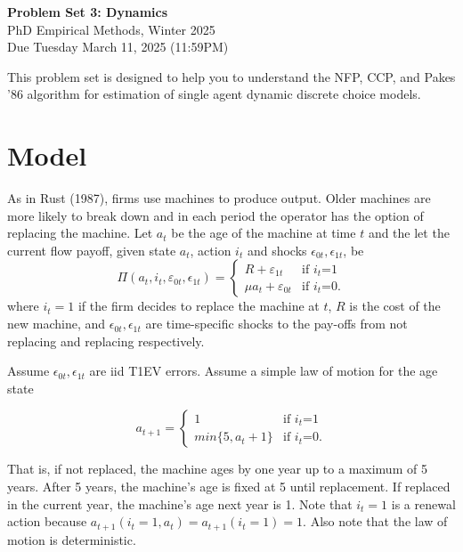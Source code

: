 \documentclass[11pt ]{article}
\begin{document}
\large\noindent
\textbf{Problem Set 3: Dynamics}\\
PhD Empirical Methods, Winter 2025\\
Due Tuesday March 11, 2025 (11:59PM)

\vspace{2em}\noindent
This problem set is designed to help you to understand the NFP, CCP, and Pakes '86 algorithm for estimation of single agent dynamic discrete choice models.

\section{Model}
As in Rust (1987), firms use machines to produce output. Older machines are more likely to break down and in each period the operator has the option of replacing the machine. Let $a_t$ be the age of the machine at time $t$ and the let the current flow payoff, given state $a_t$, action $i_t$ and shocks $\epsilon_{0t}, \epsilon_{1t}$, be
\[ \Pi(a_t, i_t, \varepsilon_{0t}, \epsilon_{1t}) = \left\{ \begin{array}{ll}
         R + \varepsilon_{1t} & \mbox{if $i_t$=1}\\
        \mu a_t +\varepsilon_{0t} & \mbox{if $i_t$=0}.\end{array} \right. \] 
 where $i_t = 1$ if the firm decides to replace the machine at $t$, $R$ is the cost of the new machine, and $\epsilon_{0t}, \epsilon_{1t}$ are time-specific shocks to the pay-offs from not replacing and replacing respectively. 

Assume $\epsilon_{0t}, \epsilon_{1t}$ are iid T1EV errors. Assume a simple law of motion for the age state

\[ a_{t+1} = \left\{ \begin{array}{ll}
       1 & \mbox{if $i_t$=1}\\
       min\{5, a_t + 1\}  & \mbox{if $i_t$=0}.\end{array} \right. \] 

That is, if not replaced, the machine ages by one year up to a maximum of 5 years. After 5 years, the machine's age is fixed at 5 until replacement. If replaced in the current year, the machine's age next year is 1. Note that $i_t = 1$ is a renewal action because $a_{t+1}(i_t = 1, a_t) = a_{t+1}(i_t = 1) = 1$. Also note that the law of motion is deterministic. 
\end{document}
